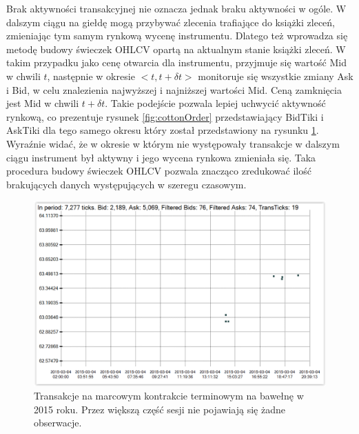 \documentclass[a4paper,12pt,openany, DIV=calc, headsepline]{scrbook}
\begin{document}
Brak aktywności transakcyjnej nie oznacza jednak braku aktywności w ogóle. W dalszym ciągu na giełdę mogą przybywać zlecenia trafiające do książki zleceń, zmieniając tym samym rynkową wycenę instrumentu. Dlatego też wprowadza się metodę budowy świeczek OHLCV opartą na aktualnym stanie książki zleceń. W takim przypadku jako cenę otwarcia dla instrumentu, przyjmuje się wartość Mid w chwili $t$, następnie w okresie $<t,t + \delta t>$ monitoruje się wszystkie zmiany Ask i Bid, w celu znalezienia najwyższej i najniższej wartości Mid. Ceną zamknięcia jest Mid w chwili $t + \delta t$. Takie podejście pozwala lepiej uchwycić aktywność rynkową, co prezentuje rysunek \ref{fig:cottonOrder} przedstawiający BidTiki i AskTiki dla tego samego okresu który został przedstawiony na rysunku \ref{fig:cottonTrans}. Wyraźnie widać, że w okresie w którym nie występowały transakcje w dalszym ciągu instrument był aktywny i jego wycena rynkowa zmieniała się. Taka procedura budowy świeczek OHLCV pozwala znacząco zredukować ilość brakujących danych występujących w szeregu czasowym. 


\begin{figure}[H]
  \centering
  \includegraphics[scale=0.5]{wykresy/cottonTickH.PNG}
  \caption{Transakcje na marcowym kontrakcie terminowym na bawełnę w 2015 roku. Przez większą część sesji nie pojawiają się żadne obserwacje.}
  \label{fig:cottonTrans}
\end{figure}
\end{document}
